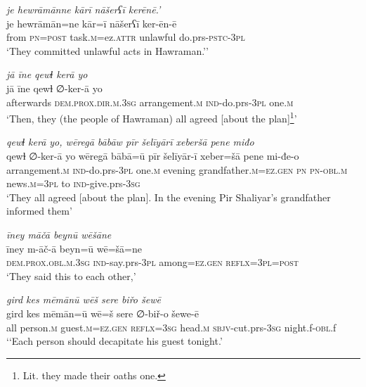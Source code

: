\ea \label{BP.62}
\textit{je hewrāmānne kārī nāšerʕī kerēnē.’} \\ 
\gll je hewrāmān=ne kār=ī nāšerʕī ker-ēn-ē \\ 
 from \textsc{pn}\textsc{=\textsc{post}} task\textsc{.m}=ez.\textsc{attr} unlawful do.prs\textsc{-pstc}\textsc{-3pl} \\ 
\glt `They committed unlawful acts in Hawraman.’'
\z 
 
\ea \label{BP.64}
\textit{jā īne qewɫ kerā yo} \\ 
\gll jā īne qewɫ ∅-ker-ā yo \\ 
 afterwards \textsc{dem.prox}\textsc{.dir}\textsc{.m}\textsc{.3sg} arrangement\textsc{.m} \textsc{ind-}do.prs\textsc{-3pl} one\textsc{.m} \\ 
\glt `Then, they (the people of Hawraman) all agreed [about the plan]\footnote{Lit. they made their oaths one.}'
\z 
 
\ea \label{BP.65}
\textit{qewɫ kerā yo, wēregā bābāw pīr šelīyārī xeberšā pene miđo} \\ 
\gll qewɫ ∅-ker-ā yo wēregā bābā=ū pīr šelīyār-ī xeber=šā pene mi-đe-o \\ 
 arrangement\textsc{.m} \textsc{ind-}do.prs\textsc{-3pl} one\textsc{.m} evening grandfather\textsc{.m}\textsc{=ez.gen} \textsc{pn} \textsc{pn}\textsc{-obl}\textsc{.m} news\textsc{.m}\textsc{=3pl} to \textsc{ind-}give.prs\textsc{-3sg} \\ 
\glt `They all agreed [about the plan]. In the evening Pir Shaliyar’s grandfather informed them'
\z 
 
\ea \label{BP.66}
\textit{īney māčā beynū wēšāne} \\ 
\gll īney m-āč-ā beyn=ū wē=šā=ne \\ 
 \textsc{dem.prox}\textsc{.obl}\textsc{.m}\textsc{.3sg} \textsc{ind-}say.prs\textsc{-3pl} among\textsc{=ez.gen} \textsc{reflx}\textsc{=3pl}\textsc{=\textsc{post}} \\ 
\glt `They said this to each other,'
\z 
 
\ea \label{BP.67}
\textit{gird kes mēmānū wēš sere biřo šewē} \\ 
\gll gird kes mēmān=ū wē=š sere ∅-biř-o šewe-ē \\ 
 all person\textsc{.m} guest\textsc{.m}\textsc{=ez.gen} \textsc{reflx}\textsc{=3sg} head\textsc{.m} \textsc{sbjv-}cut.prs\textsc{-3sg} night.f\textsc{-obl}.f \\ 
\glt `‘Each person should decapitate his guest tonight.'
\z 
 
